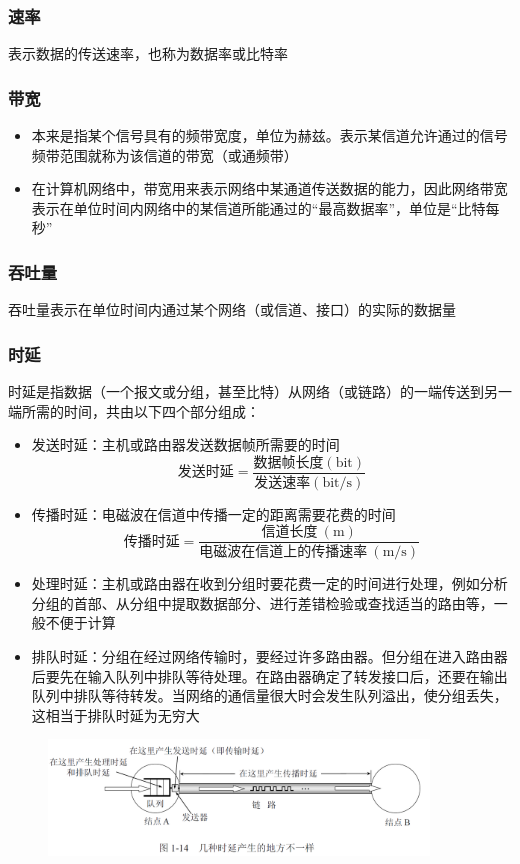 \documentclass[cs4size,a4paper,10pt]{ctexart}
\begin{document}
	\subsubsection{速率}
	表示数据的传送速率，也称为数据率或比特率

	\subsubsection{带宽}
	\begin{itemize}
		\item 本来是指某个信号具有的频带宽度，单位为赫兹。表示某信道允许通过的信号频带范围就称为该信道的带宽（或通频带）
		\item 在计算机网络中，带宽用来表示网络中某通道传送数据的能力，因此网络带宽表示在单位时间内网络中的某信道所能通过的“最高数据率”，单位是“比特每秒”
	\end{itemize}

	\subsubsection{吞吐量}
	吞吐量表示在单位时间内通过某个网络（或信道、接口）的实际的数据量

	\subsubsection{时延}
	时延是指数据（一个报文或分组，甚至比特）从网络（或链路）的一端传送到另一端所需的时间，共由以下四个部分组成：
	\begin{itemize}
		\item 发送时延：主机或路由器发送数据帧所需要的时间
		$$\mbox{发送时延}=\frac{\mbox{数据帧长度}(\mathrm{bit})}{\mbox{发送速率}(\mathrm{bit/s})}$$
		\item 传播时延：电磁波在信道中传播一定的距离需要花费的时间
		$$\mbox{传播时延}=\frac{\mbox{信道长度}\ \mathrm{(m)}}{\mbox{电磁波在信道上的传播速率}\ \mathrm{(m/s)}}$$
		\item 处理时延：主机或路由器在收到分组时要花费一定的时间进行处理，例如分析分组的首部、从分组中提取数据部分、进行差错检验或查找适当的路由等，一般不便于计算
		\item 排队时延：分组在经过网络传输时，要经过许多路由器。但分组在进入路由器后要先在输入队列中排队等待处理。在路由器确定了转发接口后，还要在输出队列中排队等待转发。当网络的通信量很大时会发生队列溢出，使分组丢失，这相当于排队时延为无穷大
	\end{itemize}
	\begin{figure}[H]
		\centering
		\includegraphics[width=0.9\textwidth]{img/1.14}
	\end{figure}
\end{document}
